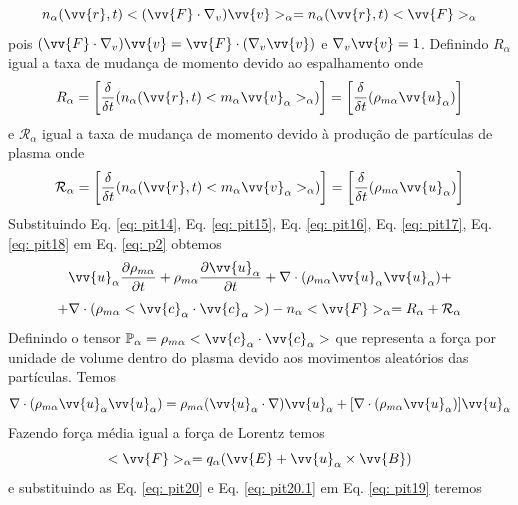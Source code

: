 \documentclass[12pt,oneside,a4paper]{abntex2}
\begin{document}
\begin{equation}
\label{eq: pit16}
n_\alpha(\vv{r},t) <(\vv{F} \cdot \nabla_v)\vv{v}>_\alpha=n_\alpha(\vv{r},t)<\vv{F}>_\alpha
\end{equation}
pois $(\vv{F} \cdot \nabla_v)\vv{v} = \vv{F} \cdot (\nabla_v\vv{v})$ e $\nabla_v\vv{v} = 1$. Definindo $R_\alpha$ igual a taxa de mudança de momento devido ao espalhamento onde
\begin{equation}
\label{eq: pit17}
R_\alpha = \left[\frac{\delta}{\delta t}(n_\alpha(\vv{r},t)<m_\alpha \vv{v}_\alpha>_\alpha)\right]=\left[\frac{\delta}{\delta t}(\rho_{m\alpha}\vv{u}_\alpha)\right]
\end{equation}
e  $\mathcal{R}_\alpha$ igual a taxa de mudança de momento devido à produção de partículas de plasma onde
\begin{equation}
\label{eq: pit18}
\mathcal{R}_\alpha = \left[\frac{\delta}{\delta t}(n_\alpha(\vv{r},t)<m_\alpha \vv{v}_\alpha>_\alpha)\right] = \left[\frac{\delta}{\delta t}(\rho_{m\alpha}\vv{u}_\alpha)\right]
\end{equation}
Substituindo Eq. \ref{eq: pit14}, Eq. \ref{eq: pit15}, Eq. \ref{eq: pit16}, Eq. \ref{eq: pit17}, Eq. \ref{eq: pit18} em Eq. \ref{eq: p2} obtemos
\begin{equation}
\label{eq: pit19}
\vv{u}_\alpha \frac{\partial \rho_{m\alpha}}{\partial t} + \rho_{m\alpha} \frac{\partial \vv{u}_\alpha}{\partial t}+ \nabla \cdot (\rho_{m\alpha} \vv{u}_\alpha \vv{u}_\alpha)+
\end{equation} 
\begin{equation*}
+\nabla \cdot (\rho_{m\alpha} <\vv{c}_\alpha \cdot \vv{c}_\alpha>)-n_\alpha<\vv{F}>_\alpha=R_\alpha + \mathcal{R}_\alpha
\end{equation*}
Definindo o tensor $\mathbb{P}_\alpha=\rho_{m\alpha} <\vv{c}_\alpha \cdot \vv{c}_\alpha>$ que representa a força por unidade de volume dentro do plasma devido aos movimentos aleatórios das partículas. Temos
\begin{equation}
\label{eq: pit20}
\nabla \cdot (\rho_{m\alpha} \vv{u}_\alpha \vv{u}_\alpha) =  \rho_{m\alpha}(\vv{u}_\alpha \cdot \nabla)\vv{u}_\alpha + [\nabla \cdot (\rho_{m\alpha} \vv{u}_\alpha)]\vv{u}_\alpha
\end{equation}
Fazendo força média igual a força de Lorentz temos 
\begin{equation}
\label{eq: pit20.1}
<\vv{F}>_\alpha = q_\alpha (\vv{E} + \vv{u}_\alpha \times \vv{B})
\end{equation} e substituindo as Eq. \ref{eq: pit20} e Eq. \ref{eq: pit20.1} em Eq. \ref{eq: pit19} teremos
\end{document}

